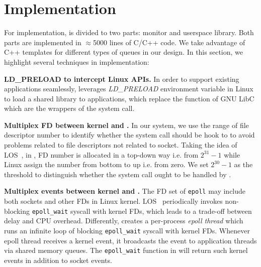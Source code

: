 \section{Implementation}
\label{sec:implementation}

For implementation, \libipc is divided to two parts: monitor and userspace library. Both parts are implemented in $\approx$5000 lines of C/C++ code. We take advantage of C++ templates for different types of queues in our design. %
In this section, we highlight several techniques in implementation:


\textbf{LD\_PRELOAD to intercept Linux APIs.}
In order to support existing applications seamlessly, \libipc leverages \textit{LD\_PRELOAD} environment variable in Linux to load a shared library to applications, which replace the function of GNU LibC which are the wrappers of the system call. 

\textbf{Multiplex FD between kernel and \libipc{}.}
In our system, we use the range of file descriptor number to identify whether the system call should be hook to \libipc to avoid problems related to file descriptors not related to socket. Taking the idea of LOS~\cite{huang2017high}, in \libipc, FD number is allocated in a top-down way i.e. from $2^{31}-1$ while Linux assign the number from bottom to up i.e. from zero. We set $2^{30} - 1 $ as the threshold to distinguish whether the system call ought to be handled by \libipc.

\textbf{Multiplex events between kernel and \libipc{}.}
The FD set of \texttt{epoll} may include both sockets and other FDs in Linux kernel. LOS~\cite{huang2017high} periodically invokes non-blocking \texttt{epoll\_wait} syscall with kernel FDs, which leads to a trade-off between delay and CPU overhead. Differently, \libipc{} creates a per-process \textit{epoll thread} which runs an infinite loop of blocking \texttt{epoll\_wait} syscall with kernel FDs. Whenever epoll thread receives a kernel event, it broadcasts the event to application threads via shared memory queues. The \texttt{epoll\_wait} function in \libipc{} will return such kernel events in addition to socket events.


